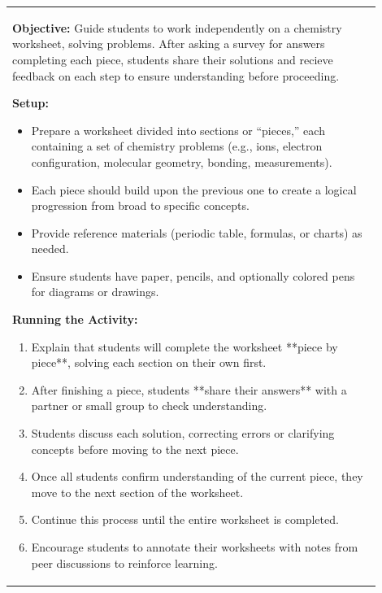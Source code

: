 \documentclass{article}
\begin{document}
\begin{tabular}{|p{0.9\linewidth}|}
\hline
\vspace{0.2cm}
\textbf{Objective:} Guide students to work independently on a chemistry worksheet, solving problems. After asking a survey for answers completing each piece, students share their solutions and recieve feedback on each step to ensure understanding before proceeding.  
\vspace{0.2cm}

\textbf{Setup:}  
\begin{itemize}  
    \item Prepare a worksheet divided into sections or “pieces,” each containing a set of chemistry problems (e.g., ions, electron configuration, molecular geometry, bonding, measurements).  
    \item Each piece should build upon the previous one to create a logical progression from broad to specific concepts.  
    \item Provide reference materials (periodic table, formulas, or charts) as needed.  
    \item Ensure students have paper, pencils, and optionally colored pens for diagrams or drawings.  
\end{itemize}  

\textbf{Running the Activity:}  
\begin{enumerate}  
    \item Explain that students will complete the worksheet **piece by piece**, solving each section on their own first.  
    \item After finishing a piece, students **share their answers** with a partner or small group to check understanding.  
    \item Students discuss each solution, correcting errors or clarifying concepts before moving to the next piece.  
    \item Once all students confirm understanding of the current piece, they move to the next section of the worksheet.  
    \item Continue this process until the entire worksheet is completed.  
    \item Encourage students to annotate their worksheets with notes from peer discussions to reinforce learning.  
\end{enumerate}  


\end{tabular}
\end{document}
